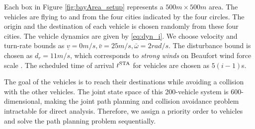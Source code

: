 Each box in Figure \ref{fig:bayArea_setup} represents a $500m \times 500m$ area. The vehicles are flying to and from the four cities indicated by the four circles. The origin and the destination of each vehicle is chosen randomly from these four cities. The vehicle dynamics are given by \eqref{eq:dyn_i}. We choose velocity and turn-rate bounds as $\underline{v} = 0m/s, \bar{v} = 25m/s, \bar\omega = 2 rad/s$. The disturbance bound is chosen as $d_{r} = 11 m/s$, which corresponds to \textit{strong winds} on Beaufort wind force scale \cite{Windscale}. The scheduled time of arrival $t^\text{STA}$ for vehicles are chosen as $5(i-1)$s.

The goal of the vehicles is to reach their destinations while avoiding a collision with the other vehicles. The joint state space of this 200-vehicle system is 600-dimensional, making the joint path planning and collision avoidance problem intractable for direct analysis. Therefore, we assign a priority order to vehicles and solve the path planning problem sequentially.